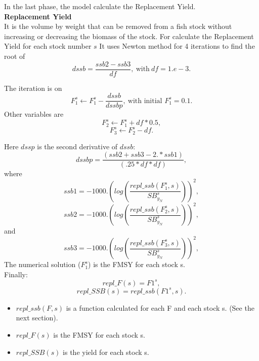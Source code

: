 \documentclass{article}
\begin{document}
In the last phase, the model calculate the Replacement Yield.\\

\textbf{Replacement Yield}\\
It is the volume by weight that can be removed from a fish stock without increasing or decreasing the biomass of the stock.
For calculate the Replacement Yield for each stock  number $s$ It uses Newton method for 4 iterations to find the root of 
\begin{equation}
    dssb   = \dfrac{ssb2 - ssb3}{df}, \ \text{with} \  df=1.e-3.
\end{equation}

The iteration is on
\begin{equation}
    F_{1}^s\leftarrow F_{1}^s-\dfrac{dssb}{dssbp}, \ \text{with initial $F_{1}^s=0.1$}.
\end{equation}
Other variables are
\begin{equation}
    F_2^s \leftarrow F_1^s+df*0.5,
\end{equation}
\begin{equation}
    F_3^s \leftarrow F_2^s -df.
\end{equation}

Here $dssp$ is the second derivative of $dssb$:
\begin{equation}
    dssbp  = \dfrac{(ssb2 + ssb3 - 2.*ssb1)}{(.25*df*df)},
\end{equation}
where
\begin{equation}
    ssb1=-1000.\left(log\left(\dfrac{repl\_ssb(F_1^s,s)}{SB^s_{y_N}}\right)\right)^2,
\end{equation}
\begin{equation}
    ssb2=-1000.\left(log\left(\dfrac{repl\_ssb(F_2^s,s)}{SB^s_{y_N}}\right)\right)^2,
\end{equation}
and
\begin{equation}
    ssb3=-1000.\left(log\left(\dfrac{repl\_ssb(F_3^s,s)}{SB^s_{y_N}}\right)\right)^2,
\end{equation}
The numerical solution ($F_1^s$) is the  FMSY for each stock s.\\
Finally:
\begin{equation}
    repl\_F(s) = F1^s,
\end{equation}
\begin{equation}
    repl\_SSB(s) = repl\_ssb(F1^s,s).
\end{equation}
\begin{itemize}
    \item $repl\_ssb(F,s)$ is a function calculated for each F and each stock s. (See the next section).
    \item $repl\_F(s)$ is the FMSY for each stock s.
    \item $repl\_SSB(s)$ is the yield for each stock s.
\end{itemize}
\end{document}
